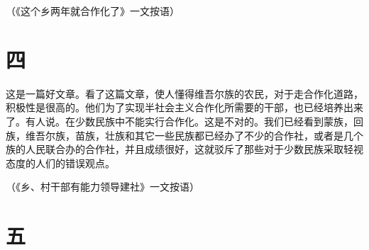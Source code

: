 （《这个乡两年就合作化了》一文按语）

\section*{四}

这是一篇好文章。看了这篇文章，使人懂得维吾尔族的农民，对于走合作化道路，积极性是很高的。他们为了实现半社会主义合作化所需要的干部，也已经培养出来了。有人说。在少数民族中不能实行合作化。这是不对的。我们已经看到蒙族，回族，维吾尔族，苗族，壮族和其它一些民族都已经办了不少的合作社，或者是几个族的人民联合办的合作社，并且成绩很好，这就驳斥了那些对于少数民族采取轻视态度的人们的错误观点。


（《乡、村干部有能力领导建社》一文按语）

\section*{五}

